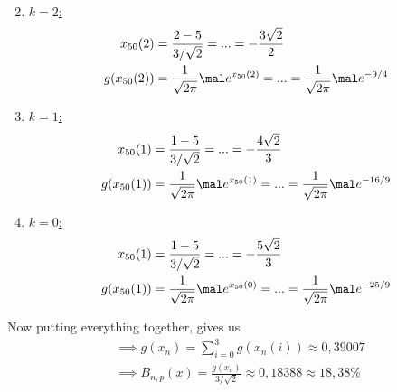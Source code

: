 \begin{solution}
\begin{enumerate}[label=]
\begin{align*}
		\end{align*}
		\item \ul{$k=2$:}
		\begin{align*}
		x_{50}(2) &= \frac{2-5}{3/\sqrt{2}} = ... = -\frac{3\sqrt{2}}{2}\\
		g(x_{50}(2)) &= \frac{1}{\sqrt{2\pi}}\mal e^{x_{50}(2)} = ... = \frac{1}{\sqrt{2\pi}} \mal e^{-9/4}
		\end{align*}
		\item \ul{$k=1$:}
		\begin{align*}
		x_{50}(1) &= \frac{1-5}{3/\sqrt{2}} = ... = -\frac{4\sqrt{2}}{3}\\
		g(x_{50}(1)) &= \frac{1}{\sqrt{2\pi}}\mal e^{x_{50}(1)} = ... = \frac{1}{\sqrt{2\pi}} \mal e^{-16/9}
		\end{align*}
		\item \ul{$k=0$:}
		\begin{align*}
		x_{50}(1) &= \frac{1-5}{3/\sqrt{2}} = ... = -\frac{5\sqrt{2}}{3}\\
		g(x_{50}(1)) &= \frac{1}{\sqrt{2\pi}}\mal e^{x_{50}(0)} = ... = \frac{1}{\sqrt{2\pi}} \mal e^{-25/9}
		\end{align*}
	\end{enumerate}
	Now putting everything together, gives us
	\begin{align*}
		&\implies g(x_n) = \sum_{i=0}^3 g(x_n(i)) \approx 0,39007\\
		&\implies B_{n,p}(x) = \frac{g(x_n)}{3/\sqrt{2}} \approx 0,18388 \approx 18,38 \%
	\end{align*}
\end{solution}
